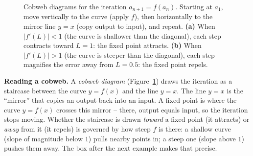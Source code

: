 \begin{figure}[H]
\caption{Cobweb diagrams for the iteration $a_{n+1} = f(a_n)$. Starting at $a_1$,
move vertically to the curve (apply $f$), then horizontally to the mirror line
$y=x$ (copy output to input), and repeat. \textbf{(a)} When $|f'(L)| < 1$
(the curve is shallower than the diagonal), each step contracts toward $L=1$:
the fixed point attracts. \textbf{(b)} When $|f'(L)| > 1$ (the curve is steeper
than the diagonal), each step magnifies the error away from $L=0.5$: the fixed
point repels.}
\label{ch28:fig-cobweb}
\end{figure}

\begin{intuitionbox}
\textbf{Reading a cobweb.} A \emph{cobweb diagram} (Figure~\ref{ch28:fig-cobweb})
draws the iteration as a staircase between the curve $y = f(x)$ and the line
$y = x$. The line $y = x$ is the ``mirror'' that copies an
output back into an input. A fixed point is where the curve $y = f(x)$ crosses
this mirror -- there, output equals input, so the iteration stops moving. Whether
the staircase is drawn \emph{toward} a fixed point (it attracts) or \emph{away}
from it (it repels) is governed by how steep $f$ is there: a shallow curve
(slope of magnitude below $1$) pulls nearby points in; a steep one (slope above
$1$) pushes them away. The box after the next example makes that precise.
\end{intuitionbox}

